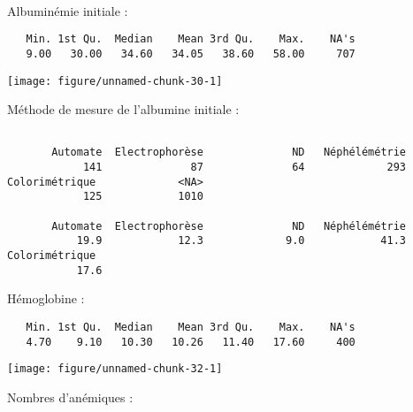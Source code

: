 \documentclass[11pt,a4paper]{article}\usepackage[]{graphicx}\usepackage[]{color}
\makeatletter
\def\maxwidth{ %
  \ifdim\Gin@nat@width>\linewidth
    \linewidth
  \else
    \Gin@nat@width
  \fi
}
\newenvironment{kframe}{%
 \def\at@end@of@kframe{}%
 \ifinner\ifhmode%
  \def\at@end@of@kframe{\end{minipage}}%
  \begin{minipage}{\columnwidth}%
 \fi\fi%
 \def\FrameCommand##1{\hskip\@totalleftmargin \hskip-\fboxsep
 \colorbox{shadecolor}{##1}\hskip-\fboxsep
     \hskip-\linewidth \hskip-\@totalleftmargin \hskip\columnwidth}%
 \MakeFramed {\advance\hsize-\width
   \@totalleftmargin\z@ \linewidth\hsize
   \@setminipage}}%
 {\par\unskip\endMakeFramed%
 \at@end@of@kframe}
\newenvironment{knitrout}{}{} %
\makeatother
\begin{document}
~\\

Albuminémie initiale :


\begin{knitrout}
\color{fgcolor}\begin{kframe}
\begin{verbatim}
   Min. 1st Qu.  Median    Mean 3rd Qu.    Max.    NA's 
   9.00   30.00   34.60   34.05   38.60   58.00     707 
\end{verbatim}
\end{kframe}
\texttt{[image: figure/unnamed-chunk-30-1]} 

\end{knitrout}

Méthode de mesure de l'albumine initiale :

\begin{knitrout}
\color{fgcolor}\begin{kframe}
\begin{verbatim}

       Automate  Electrophorèse              ND   Néphélémétrie 
            141              87              64             293 
Colorimétrique             <NA> 
            125            1010 

       Automate  Electrophorèse              ND   Néphélémétrie 
           19.9            12.3             9.0            41.3 
Colorimétrique  
           17.6 
\end{verbatim}
\end{kframe}
\end{knitrout}

Hémoglobine :

\begin{knitrout}
\color{fgcolor}\begin{kframe}
\begin{verbatim}
   Min. 1st Qu.  Median    Mean 3rd Qu.    Max.    NA's 
   4.70    9.10   10.30   10.26   11.40   17.60     400 
\end{verbatim}
\end{kframe}
\texttt{[image: figure/unnamed-chunk-32-1]} 

\end{knitrout}

Nombres d'anémiques :
\end{document}
